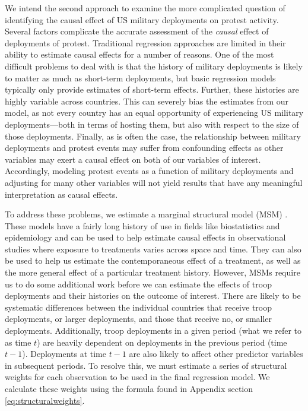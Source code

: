 We intend the second approach to examine the more complicated question of identifying the causal effect of US military deployments on protest activity. Several factors complicate the accurate assessment of the \textit{causal} effect of deployments of protest. Traditional regression approaches are limited in their ability to estimate causal effects for a number of reasons. One of the most difficult problems to deal with is that the history of military deployments is likely to matter as much as short-term deployments, but basic regression models typically only provide estimates of short-term effects. Further, these histories are highly variable across countries. This can severely bias the estimates from our model, as not every country has an equal opportunity of experiencing US military deployments---both in terms of hosting them, but also with respect to the size of those deployments. Finally, as is often the case, the relationship between military deployments and protest events may suffer from confounding effects as other variables may exert a causal effect on both of our variables of interest. Accordingly, modeling protest events as a function of military deployments and adjusting for many other variables will not yield results that have any meaningful interpretation as causal effects. 

To address these problems, we estimate a marginal structural model (MSM) \cite{Robinsetal2000,BlackwellGlynn2018}. These models have a fairly long history of use in fields like biostatistics and epidemiology and can be used to help estimate causal effects in observational studies where exposure to treatments varies across space and time. They can also be used to help us estimate the contemporaneous effect of a treatment, as well as the more general effect of a particular treatment history. However, MSMs require us to do some additional work before we can estimate the effects of troop deployments and their histories on the outcome of interest. There are likely to be systematic differences between the individual countries that receive troop deployments, or larger deployments, and those that receive no, or smaller deployments. Additionally, troop deployments in a given period (what we refer to as time $t$) are heavily dependent on deployments in the previous period (time $t-1$). Deployments at time $t-1$ are also likely to affect other predictor variables in subsequent periods. To resolve this, we must estimate a series of structural weights for each observation to be used in the final regression model. We calculate these weights using the formula found in Appendix section \ref{eq:structuralweights}.



